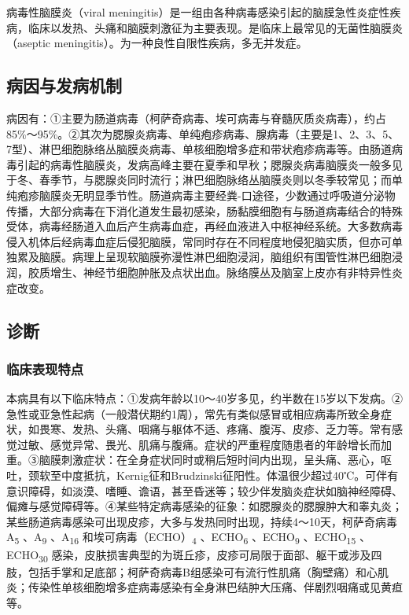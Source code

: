 病毒性脑膜炎（viral
meningitis）是一组由各种病毒感染引起的脑膜急性炎症性疾病，临床以发热、头痛和脑膜刺激征为主要表现。是临床上最常见的无菌性脑膜炎（aseptic
meningitis）。为一种良性自限性疾病，多无并发症。

\subsection{病因与发病机制}

病因有：①主要为肠道病毒（柯萨奇病毒、埃可病毒与脊髓灰质炎病毒），约占85\%～95\%。②其次为腮腺炎病毒、单纯疱疹病毒、腺病毒（主要是1、2、3、5、7型）、淋巴细胞脉络丛脑膜炎病毒、单核细胞增多症和带状疱疹病毒等。由肠道病毒引起的病毒性脑膜炎，发病高峰主要在夏季和早秋；腮腺炎病毒脑膜炎一般多见于冬、春季节，与腮腺炎同时流行；淋巴细胞脉络丛脑膜炎则以冬季较常见；而单纯疱疹脑膜炎无明显季节性。肠道病毒主要经粪-口途径，少数通过呼吸道分泌物传播，大部分病毒在下消化道发生最初感染，肠黏膜细胞有与肠道病毒结合的特殊受体，病毒经肠道入血后产生病毒血症，再经血液进入中枢神经系统。大多数病毒侵入机体后经病毒血症后侵犯脑膜，常同时存在不同程度地侵犯脑实质，但亦可单独累及脑膜。病理上呈现软脑膜弥漫性淋巴细胞浸润，脑组织有围管性淋巴细胞浸润，胶质增生、神经节细胞肿胀及点状出血。脉络膜丛及脑室上皮亦有非特异性炎症改变。

\subsection{诊断}

\subsubsection{临床表现特点}

本病具有以下临床特点：①发病年龄以10～40岁多见，约半数在15岁以下发病。②急性或亚急性起病（一般潜伏期约1周），常先有类似感冒或相应病毒所致全身症状，如畏寒、发热、头痛、咽痛与躯体不适、疼痛、腹泻、皮疹、乏力等。常有感觉过敏、感觉异常、畏光、肌痛与腹痛。症状的严重程度随患者的年龄增长而加重。③脑膜刺激症状：在全身症状同时或稍后短时间内出现，呈头痛、恶心，呕吐，颈软至中度抵抗，Kernig征和Brudzinski征阳性。体温很少超过40℃。可伴有意识障碍，如淡漠、嗜睡、谵语，甚至昏迷等；较少伴发脑炎症状如脑神经障碍、偏瘫与感觉障碍等。④某些特定病毒感染的征象：如腮腺炎的腮腺肿大和睾丸炎；某些肠道病毒感染可出现皮疹，大多与发热同时出现，持续4～10天，柯萨奇病毒A\textsubscript{5}
、A\textsubscript{9} 、A\textsubscript{16}
和埃可病毒（ECHO）\textsubscript{4} 、ECHO\textsubscript{6}
、ECHO\textsubscript{9} 、ECHO\textsubscript{15}
、ECHO\textsubscript{30}
感染，皮肤损害典型的为斑丘疹，皮疹可局限于面部、躯干或涉及四肢，包括手掌和足底部；柯萨奇病毒B组感染可有流行性肌痛（胸壁痛）和心肌炎；传染性单核细胞增多症病毒感染有全身淋巴结肿大压痛、伴剧烈咽痛或见黄疸等。

